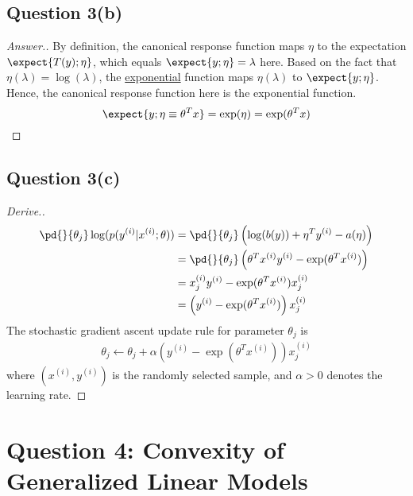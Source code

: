 \documentclass[11pt]{article}
\newcommand{\upi}[0]{^{(i)}}
\begin{document}
	\subsection{Question 3(b)}
	\begin{proof}[Answer.]
	\par By definition, the canonical response function maps $\eta$ to the expectation $\expect{T(y); \eta}$, which equals $\expect{y; \eta} = \lambda$ here. Based on the fact that $\eta(\lambda) = \log(\lambda)$, the \ul{exponential} function maps $\eta(\lambda)$ to $\expect{y; \eta}$. Hence, the canonical response function here is the exponential function.
	\begin{equation}
		\expect{y; \eta \equiv \theta^T x} = \exp(\eta) = \exp(\theta^T x)
	\end{equation}
	\end{proof}
	
	\subsection{Question 3(c)}
	\begin{proof}[Derive.]
	\begin{align}
		\pd{}{\theta_j} \log (p(y\upi|x\upi; \theta)) &= \pd{}{\theta_j} 
		\left (\log(b(y)) + \eta^T y\upi - a(\eta) \right )\\
		&= \pd{}{\theta_j} \left (
		\theta^T x\upi y\upi - \exp(\theta^T x\upi)
		\right ) \\
		&= x\upi_j y\upi - \exp(\theta^T x\upi) x\upi_j \\
		&= \left(y\upi - \exp(\theta^T x\upi )\right) x\upi_j
	\end{align}
	The stochastic gradient ascent update rule for parameter $\theta_j$ is 
	\begin{align}
		\theta_j \leftarrow \theta_j + \alpha \left(y\upi - \exp(\theta^T x\upi )\right) x\upi_j
	\end{align}
	where $(x\upi, y\upi)$ is the randomly selected sample, and $\alpha > 0$ denotes the learning rate.
	\end{proof}
	
	\newpage
	\section{Question 4: Convexity of Generalized Linear Models}
\end{document}
